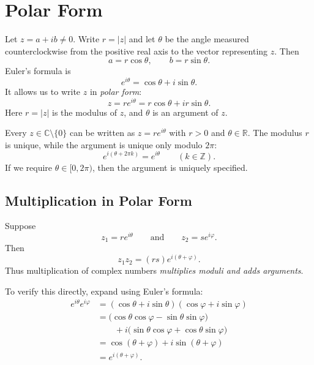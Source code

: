 \documentclass[11pt]{article}
\theoremstyle{definition}
\theoremstyle{remark}
\newcommand{\C}{\mathbb{C}}
\newcommand{\R}{\mathbb{R}}
\newcommand{\RePart}{\operatorname{Re}}
\newcommand{\ImPart}{\operatorname{Im}}
\begin{document}
\section{Polar Form}

Let $z=a+ib\ne 0$.  Write $r=|z|$ and let $\theta$ be the angle measured
counterclockwise from the positive real axis to the vector representing $z$.
Then
\[
  a=r\cos\theta,
  \qquad
  b=r\sin\theta.
\]
Euler's formula is
\[
  e^{i\theta}=\cos\theta+i\sin\theta.
\]
It allows us to write $z$ in \emph{polar form}:
\[
  \boxed{z=re^{i\theta}}
  =r\cos\theta+i r\sin\theta.
\]
Here $r=|z|$ is the modulus of $z$, and $\theta$ is an argument of $z$.

\begin{center}
\end{center}

Every $z\in\C\setminus\{0\}$ can be written as $z=re^{i\theta}$ with
$r>0$ and $\theta\in\R$.  The modulus $r$ is unique, while the argument is
unique only modulo $2\pi$:
\[
  e^{i(\theta+2\pi k)}=e^{i\theta}
  \qquad (k\in\mathbb Z).
\]
If we require $\theta\in[0,2\pi)$, then the argument is uniquely specified.

\subsection{Multiplication in Polar Form}

Suppose
\[
  z_1=re^{i\theta}
  \qquad\text{and}\qquad
  z_2=se^{i\varphi}.
\]
Then
\[
  z_1z_2=(rs)e^{i(\theta+\varphi)}.
\]
Thus multiplication of complex numbers \emph{multiplies moduli and adds
arguments}.

To verify this directly, expand using Euler's formula:
\begin{align*}
  e^{i\theta}e^{i\varphi}
  &= (\cos\theta+i\sin\theta)(\cos\varphi+i\sin\varphi)\\
  &= \bigl(\cos\theta\cos\varphi-\sin\theta\sin\varphi\bigr)\\
  &\qquad
     +i\bigl(\sin\theta\cos\varphi+\cos\theta\sin\varphi\bigr)\\
  &= \cos(\theta+\varphi)+i\sin(\theta+\varphi)\\
  &= e^{i(\theta+\varphi)}.
\end{align*}
\end{document}
